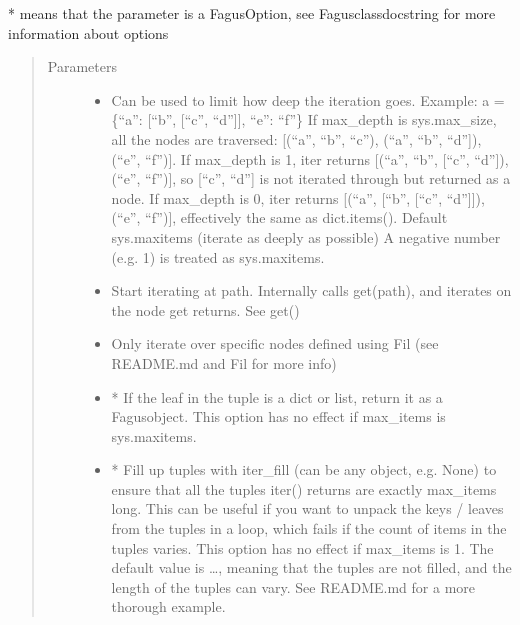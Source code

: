 \documentclass[a4paper,10pt,english]{sphinxmanual}
\begin{document}
\begin{fulllineitems}
\begin{fulllineitems}
\sphinxAtStartPar
* means that the parameter is a FagusOption, see Fagus\sphinxhyphen{}class\sphinxhyphen{}docstring for more information about options
\begin{quote}\begin{description}
\item[{Parameters}] \leavevmode\begin{itemize}
\item {}
\sphinxAtStartPar
{} \textendash{} Can be used to limit how deep the iteration goes. Example: a = \{“a”: {[}“b”, {[}“c”, “d”{]}{]}, “e”: “f”\}
If max\_depth is sys.max\_size, all the nodes are traversed: {[}(“a”, “b”, “c”), (“a”, “b”, “d”{]}),
(“e”, “f”){]}. If max\_depth is 1, iter returns {[}(“a”, “b”, {[}“c”, “d”{]}), (“e”, “f”){]}, so {[}“c”, “d”{]} is not
iterated through but returned as a node. If max\_depth is 0, iter returns {[}(“a”, {[}“b”, {[}“c”, “d”{]}{]}),
(“e”, “f”){]}, effectively the same as dict.items(). Default sys.maxitems (iterate as deeply as possible)
A negative number (e.g. \sphinxhyphen{}1) is treated as sys.maxitems.

\item {}
\sphinxAtStartPar
{} \textendash{} Start iterating at path. Internally calls get(path), and iterates on the node get returns. See get()

\item {}
\sphinxAtStartPar
{} \textendash{} Only iterate over specific nodes defined using Fil (see README.md and Fil for more info)

\item {}
\sphinxAtStartPar
{} \textendash{} * If the leaf in the tuple is a dict or list, return it as a Fagus\sphinxhyphen{}object. This option has no
effect if max\_items is sys.maxitems.

\item {}
\sphinxAtStartPar
{} \textendash{} * Fill up tuples with iter\_fill (can be any object, e.g. None) to ensure that all the tuples
iter() returns are exactly max\_items long. This can be useful if you want to unpack the keys / leaves
from the tuples in a loop, which fails if the count of items in the tuples varies. This option has no
effect if max\_items is \sphinxhyphen{}1. The default value is …, meaning that the tuples are not filled, and the
length of the tuples can vary. See README.md for a more thorough example.


\end{itemize}
\end{description}
\end{quote}
\end{fulllineitems}
\end{fulllineitems}
\end{document}
